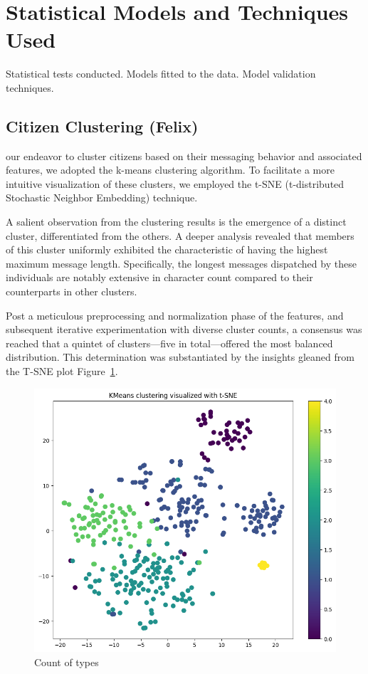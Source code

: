 \documentclass[12pt]{article}
\begin{document}
\section{Statistical Models and Techniques Used}

Statistical tests conducted.
Models fitted to the data.
Model validation techniques.


\subsection{Citizen Clustering (Felix)}

our endeavor to cluster citizens based on their messaging behavior and associated features, we adopted the k-means clustering algorithm. To facilitate a more intuitive visualization of these clusters, we employed the t-SNE (t-distributed Stochastic Neighbor Embedding) technique. 

A salient observation from the clustering results is the emergence of a distinct cluster, differentiated from the others. A deeper analysis revealed that members of this cluster uniformly exhibited the characteristic of having the highest maximum message length. Specifically, the longest messages dispatched by these individuals are notably extensive in character count compared to their counterparts in other clusters.

Post a meticulous preprocessing and normalization phase of the features, and subsequent iterative experimentation with diverse cluster counts, a consensus was reached that a quintet of clusters—five in total—offered the most balanced distribution. This determination was substantiated by the insights gleaned 
from the T-SNE plot Figure~\ref{fig:cluster}.

\begin{figure}[h]
  \centering
  \includegraphics[width=0.7\linewidth]{images/Kmeans_5_clusters}
  \caption{Count of types}
  \label{fig:cluster}
  \end{figure}
\end{document}
